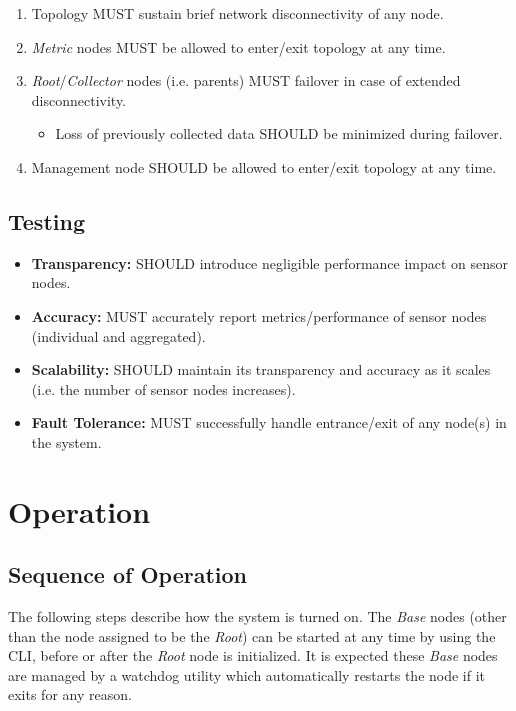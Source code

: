 \begin{enumerate}

\item Topology MUST sustain brief network disconnectivity of any node.
\item \textit{Metric} nodes MUST be allowed to enter/exit topology at any time.
\item \textit{Root}/\textit{Collector} nodes (i.e. parents) MUST failover in case of extended disconnectivity.
      \begin{itemize}
      \item Loss of previously collected data SHOULD be minimized during failover.
      \end{itemize}
\item Management node SHOULD be allowed to enter/exit topology at any time.

\end{enumerate}

\subsection{Testing}

\begin{itemize}

\item \textbf{Transparency:} \dcamp SHOULD introduce negligible performance impact on sensor nodes.
\item \textbf{Accuracy:} \dcamp MUST accurately report metrics/performance of sensor nodes (individual and aggregated).
\item \textbf{Scalability:} \dcamp SHOULD maintain its transparency and accuracy as it scales (i.e. the number of sensor
      nodes increases).
\item \textbf{Fault Tolerance:} \dcamp MUST successfully handle entrance/exit of any node(s) in the system.

\end{itemize}

\section{\dcamp Operation}

\subsection{Sequence of \dcamp Operation}
\label{operation_sequnce}

The following steps describe how the \dcamp system is turned on. The \textit{Base} nodes (other than the node assigned
to be the \textit{Root}) can be started at any time by using the \dcamp CLI, before or after the \textit{Root} node is
initialized. It is expected these \textit{Base} nodes are managed by a watchdog utility which automatically restarts the
node if it exits for any reason.

